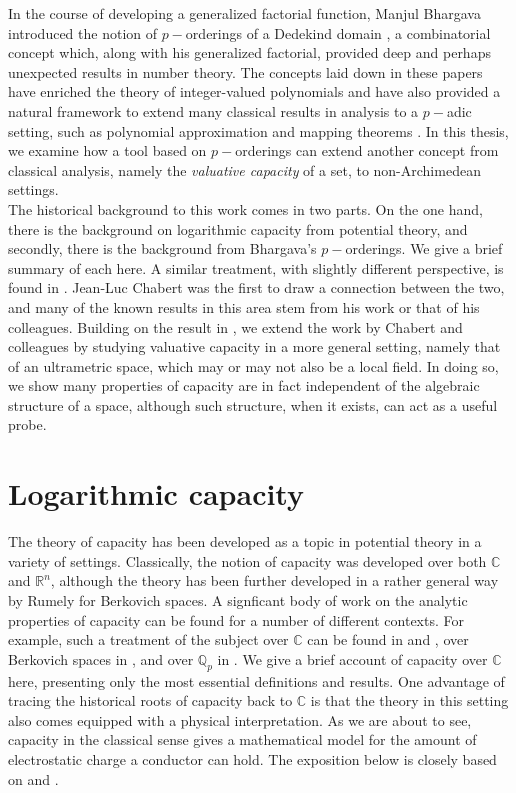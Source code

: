 
In the course of developing a generalized factorial function, Manjul Bhargava introduced the notion of $p-$orderings of a Dedekind domain \cite{mb1, mb2}, a combinatorial concept which, along with his generalized factorial, provided deep and perhaps unexpected results in number theory. The concepts laid down in these papers have enriched the theory of integer-valued polynomials \cite{mb3, kj2} and have also provided a natural framework to extend many classical results in analysis to a $p-$adic setting, such as polynomial approximation and mapping theorems \cite{mb1, mb2,mb3}. In this thesis, we examine how a tool based on $p-$orderings can extend another concept from classical analysis, namely the \textit{valuative capacity} of a set, to non-Archimedean settings.\\

The historical background to this work comes in two parts. On the one hand, there is the background on logarithmic capacity from potential theory, and secondly, there is the background from Bhargava's $p-$orderings. We give a brief summary of each here. A similar treatment, with slightly different perspective, is found in \cite{fp}. Jean-Luc Chabert was the first to draw a connection between the two, and many of the known results in this area stem from his work or that of his colleagues. Building on the result in \cite{kj}, we extend the work by Chabert and colleagues by studying valuative capacity in a more general setting, namely that of an ultrametric space, which may or may not also be a local field. In doing so, we show many properties of capacity are in fact independent of the algebraic structure of a space, although such structure, when it exists, can act as a useful probe.\\

\section{Logarithmic capacity}
The theory of capacity has been developed as a topic in potential theory in a variety of settings. Classically, the notion of capacity was developed over both $\mathbb{C}$ and $\mathbb{R}^n$, although the theory has been further developed in a rather general way by Rumely for Berkovich spaces. A  signficant body of work on the analytic properties of capacity can be found for a number of different contexts. For example, such a treatment of the subject over $\mathbb{C}$ can be found in \cite{wer} and \cite{rand}, over Berkovich spaces in \cite{rum}, and over $\mathbb{Q}_p$ in \cite{dgc}. We give a brief account of capacity over $\mathbb{C}$ here, presenting only the most essential definitions and results.   One advantage of tracing the historical roots of capacity back to $\mathbb{C}$ is that the theory in this setting also comes equipped with a physical interpretation. As we are about to see, capacity in the classical sense gives a mathematical model for the amount of electrostatic charge a conductor can hold. The exposition below is closely based on \cite{rand} and \cite{rand2}.\\

